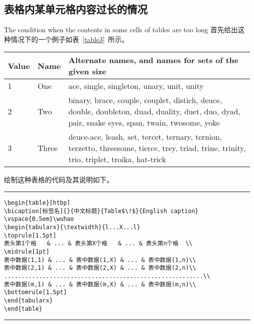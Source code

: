\subsection{表格内某单元格内容过长的情况}{The condition when the contents in some cells of tables are too long}
首先给出这种情况下的一个例子如表~\ref{table3}~所示。
\begin{table}[htbp]
  \centering
{}\vspace{0.5em}\wuhao
\begin{tabularx}{0.7\textwidth}{llX}
\toprule[1.5pt]
Value & Name & Alternate names, and names for sets of the given size\\\midrule[1pt]
1 & One & ace, single, singleton, unary, unit, unity\\
2 & Two & binary, brace, couple, couplet, distich, deuce, double, doubleton, duad, duality, duet, duo, dyad, pair, snake eyes, span, twain, twosome, yoke\\
3 & Three & deuce-ace, leash, set, tercet, ternary, ternion, terzetto, threesome, tierce, trey, triad, trine, trinity, trio, triplet, troika, hat-trick\\\bottomrule[1.5pt]
\end{tabularx}
\end{table}

绘制这种表格的代码及其说明如下。
\vspace{1em}\noindent\hrule
\begin{lstlisting}
\begin{table}[htbp]
\bicaption[标签名]{}{中文标题}{Table$\!$}{English caption}
\vspace{0.5em}\wuhao
\begin{tabularx}{\textwidth}{l...X...l}
\toprule[1.5pt]
表头第1个格   & ... & 表头第X个格   & ... & 表头第n个格  \\
\midrule[1pt]
表中数据(1,1) & ... & 表中数据(1,X) & ... & 表中数据(1,n)\\
表中数据(2,1) & ... & 表中数据(2,X) & ... & 表中数据(2,n)\\
.........................................................\\
表中数据(m,1) & ... & 表中数据(m,X) & ... & 表中数据(m,n)\\
\bottomrule[1.5pt]
\end{tabularx}
\end{table}
\end{lstlisting}
\noindent\hrule

